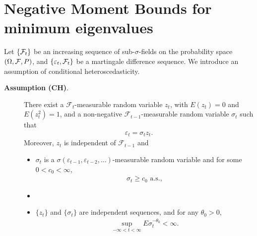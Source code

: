\documentclass[ejsv2]{imsart}
\theoremstyle{plain}
\theoremstyle{definition}
\theoremstyle{remark}
\begin{document}
\section{Negative Moment Bounds for minimum eigenvalues}\label{sec:2}
Let $\{{\cal F}_t\}$ be an increasing sequence of sub-$\sigma$-fields
on the probability space $(\Omega, {\cal F}, P)$,
and
$\{\varepsilon_t, {\cal F}_t\}$ be a martingale difference sequence.
We introduce an assumption of conditional heteroscedasticity. %
\begin{description}
\item[\textbf{Assumption (CH)}.]
\noindent \normalfont There exist a $\mathcal{F}_t$-measurable random variable $z_t$,
with $E(z_t)=0$ and $E(z_t^2)=1$, and a
non-negative $\mathcal{F}_{t-1}$-measurable random variable $\sigma_t$ such that
\begin{eqnarray}
\label{varepsilon basic form}
\varepsilon_t=\sigma_tz_t.
\end{eqnarray}
Moreover, $z_t$ is independent of $\mathcal{F}_{t-1}$ and
\begin{itemize}
\item[(i)]
$\sigma_t$ is a $\sigma(\varepsilon_{t-1},\varepsilon_{t-2},\ldots)$-measurable random variable and for some 
$0<c_0<\infty$,
\begin{eqnarray}
\label{ing101}
\sigma_t \geq c_0 \,\,\mbox{a.s.},
\end{eqnarray}
\item[or]
\item[(ii)]
$\{z_t\}$
and $\{\sigma_t\}$ are
independent sequences, and for any $\theta_0>0$,
\begin{eqnarray}
\label{ing102}
\sup\limits_{-\infty<t<\infty}E\sigma_t^{-\theta_0}<\infty.
\end{eqnarray}


\end{itemize}
\end{description}
\end{document}
